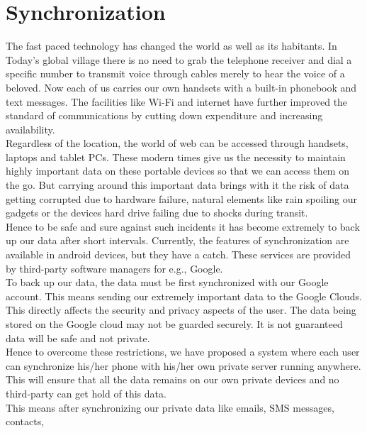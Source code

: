 \section{Synchronization}
\hspace*{0.82cm}The fast paced technology has changed the world as well as its habitants. In Today’s
global village there is no need to grab the telephone receiver and dial a specific number to
transmit voice through cables merely to hear the voice of a beloved. Now each of us carries
our own handsets with a built-in phonebook and text messages. The facilities like Wi-Fi and
internet have further improved the standard of communications by cutting down expenditure
and increasing availability.\\[0.5cm]
\hspace*{0.82cm}Regardless of the location, the world of web can be accessed through handsets,
laptops and tablet PCs. These modern times give us the necessity to maintain highly
important data on these portable devices so that we can access them on the go. But carrying
around this important data brings with it the risk of data getting corrupted due to hardware
failure, natural elements like rain spoiling our gadgets or the devices hard drive failing due to
shocks during transit.\\[0.5cm]
\hspace*{0.82cm}Hence to be safe and sure against such incidents it has become extremely to back up
our data after short intervals. Currently, the features of synchronization are available in
android devices, but they have a catch. These services are provided by third-party software
managers for e.g., Google.\\[0.5cm]
\hspace*{0.82cm}To back up our data, the data must be first synchronized with our Google account.
This means sending our extremely important data to the Google Clouds. This directly affects
the security and privacy aspects of the user. The data being stored on the Google cloud may
not be guarded securely. It is not guaranteed data will be safe and not private.\\[0.5cm]
\hspace*{0.82cm}Hence to overcome these restrictions, we have proposed a system where each user can
synchronize his/her phone with his/her own private server running anywhere. This will
ensure that all the data remains on our own private devices and no third-party can get hold of
this data.\\[0.5cm]
\hspace*{0.82cm}This means after synchronizing our private data like emails, SMS messages, contacts,
